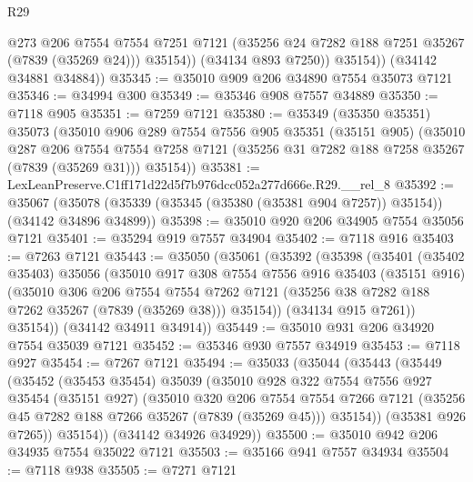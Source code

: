 \begin{lexlean}{R29}
\begin{coremodule}
                @273
                @206
                @7554
                @7554
                @7251
                @7121
                (@35256 @24 @7282 @188 @7251 @35267 (@7839 (@35269 @24)))
                @35154))
            (@34134 @893 @7250))
          @35154))
      (@34142 @34881 @34884))
@35345 := @35010 @909 @206 @34890 @7554 @35073 @7121
@35346 := @34994 @300
@35349 := @35346 @908 @7557 @34889
@35350 := @7118 @905
@35351 := @7259 @7121
@35380 := @35349
    (@35350 @35351)
    @35073
    (@35010
      @906
      @289
      @7554
      @7556
      @905
      @35351
      (@35151 @905)
      (@35010
        @287
        @206
        @7554
        @7554
        @7258
        @7121
        (@35256 @31 @7282 @188 @7258 @35267 (@7839 (@35269 @31)))
        @35154))
@35381 := LexLeanPreserve.C1ff171d22d5f7b976dcc052a277d666e.R29.__rel_8
@35392 := @35067
    (@35078 (@35339 (@35345 (@35380 (@35381 @904 @7257)) @35154)) (@34142 @34896 @34899))
@35398 := @35010 @920 @206 @34905 @7554 @35056 @7121
@35401 := @35294 @919 @7557 @34904
@35402 := @7118 @916
@35403 := @7263 @7121
@35443 := @35050
    (@35061
      (@35392
        (@35398
          (@35401
            (@35402 @35403)
            @35056
            (@35010
              @917
              @308
              @7554
              @7556
              @916
              @35403
              (@35151 @916)
              (@35010
                @306
                @206
                @7554
                @7554
                @7262
                @7121
                (@35256 @38 @7282 @188 @7262 @35267 (@7839 (@35269 @38)))
                @35154))
            (@34134 @915 @7261))
          @35154))
      (@34142 @34911 @34914))
@35449 := @35010 @931 @206 @34920 @7554 @35039 @7121
@35452 := @35346 @930 @7557 @34919
@35453 := @7118 @927
@35454 := @7267 @7121
@35494 := @35033
    (@35044
      (@35443
        (@35449
          (@35452
            (@35453 @35454)
            @35039
            (@35010
              @928
              @322
              @7554
              @7556
              @927
              @35454
              (@35151 @927)
              (@35010
                @320
                @206
                @7554
                @7554
                @7266
                @7121
                (@35256 @45 @7282 @188 @7266 @35267 (@7839 (@35269 @45)))
                @35154))
            (@35381 @926 @7265))
          @35154))
      (@34142 @34926 @34929))
@35500 := @35010 @942 @206 @34935 @7554 @35022 @7121
@35503 := @35166 @941 @7557 @34934
@35504 := @7118 @938
@35505 := @7271 @7121

\end{coremodule}
\end{lexlean}
